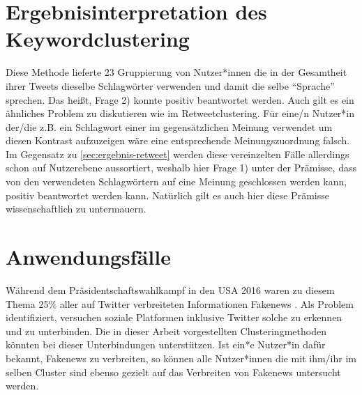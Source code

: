 \section{Ergebnisinterpretation des Keywordclustering}
Diese Methode lieferte 23 Gruppierung von Nutzer*innen die in der Gesamtheit ihrer Tweets dieselbe Schlagwörter verwenden und damit die selbe "`Sprache"' sprechen. Das heißt, Frage 2) konnte positiv beantwortet werden. Auch gilt es  ein ähnliches Problem zu diskutieren wie im Retweetclustering. Für eine/n Nutzer*in der/die z.B. ein Schlagwort einer im gegensätzlichen Meinung verwendet um diesen Kontrast aufzuzeigen wäre eine entsprechende Meinungszuordnung falsch.
Im Gegensatz zu \ref{sec:ergebnis-retweet} werden diese vereinzelten Fälle allerdings schon auf Nutzerebene aussortiert, weshalb hier Frage 1) unter der Prämisse, dass von den verwendeten Schlagwörtern auf eine Meinung geschlossen werden kann, positiv beantwortet werden kann.
Natürlich gilt es auch hier diese Prämisse wissenschaftlich zu untermauern.

\section{Anwendungsfälle}
Während dem Präsidentschaftswahlkampf in den USA 2016 waren zu diesem Thema 25\% aller auf Twitter verbreiteten Informationen \gls{Fakenews} \cite{fake-news}.
Als Problem identifiziert, versuchen soziale Platformen inklusive Twitter solche zu erkennen und zu unterbinden. 
Die in dieser Arbeit vorgestellten Clusteringmethoden könnten bei dieser Unterbindungen unterstützen. Ist ein*e Nutzer*in dafür bekannt, Fakenews zu verbreiten, so können alle Nutzer*innen die mit ihm/ihr im selben Cluster sind ebenso gezielt auf das Verbreiten von Fakenews untersucht werden. 